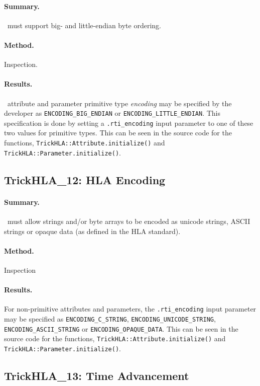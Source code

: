 \paragraph{Summary.}
\TrickHLA\ must support big- and little-endian byte ordering.
\paragraph{Method.} Inspection.
\paragraph{Results.}
\TrickHLA\ attribute and parameter primitive type {\em encoding} may be
specified by the developer as
{\tt ENCODING\_BIG\_ENDIAN} or {\tt ENCODING\_LITTLE\_ENDIAN}.
This specification is done by setting a {\tt .rti\_encoding} input
parameter to one of these two values for primitive types.
This can be seen in the source code for the functions,
{\tt TrickHLA::Attri\-bute.\-init\-ial\-ize()}
and
{\tt TrickHLA::Para\-meter.\-init\-ial\-ize()}.

\subsection{TrickHLA\_12: HLA Encoding}
\paragraph{Summary.}
\TrickHLA\ must allow strings and/or byte arrays to be encoded as
unicode strings, ASCII strings or opaque data (as defined in the HLA standard).
\paragraph{Method.} Inspection
\paragraph{Results.}
For non-primitive attributes and parameters,
the {\tt .rti\_encoding} input parameter may be specified as
{\tt ENCODING\_C\_STRING}, 
{\tt ENCODING\_UNICODE\_STRING}, 
{\tt ENCODING\_ASCII\_STRING} or
{\tt ENCODING\_OPAQUE\_DATA}.
This can be seen in the source code for the functions,
{\tt TrickHLA::Attribute.initialize()}
and
{\tt TrickHLA::Parameter.initialize()}.


\subsection{TrickHLA\_13: Time Advancement}
